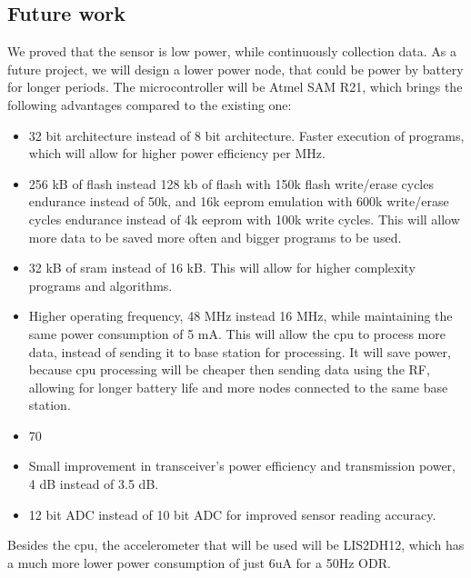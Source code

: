 \subsection{Future work}

We proved that the sensor is low power, while continuously collection data. As a future project, we will design a lower power node, that could be power by battery for longer periods. The microcontroller will be Atmel SAM R21, which brings the following advantages compared to the existing one:

\begin{itemize}
    \item 32 bit architecture instead of 8 bit architecture. Faster execution of programs, which
        will allow for higher power efficiency per MHz.
    \item 256 kB of flash instead 128 kb of flash with 150k flash write/erase cycles endurance
        instead of 50k, and 16k eeprom emulation with 600k write/erase cycles endurance instead of 4k eeprom with 100k write cycles. This will allow more data to be saved more often and bigger programs to be used.
    \item 32 kB of sram instead of 16 kB. This will allow for higher complexity programs and algorithms.
    \item Higher operating frequency, 48 MHz instead 16 MHz, while maintaining the same power
        consumption of 5 mA. This will allow the cpu to process more data, instead of sending it
        to base station for processing. It will save power, because cpu processing will be cheaper
        then sending data using the RF, allowing for longer battery life and more nodes connected
        to the same base station.
    \item 70%
    \item Small improvement in transceiver's power efficiency and transmission power, 4 dB instead of 3.5 dB.
    \item 12 bit ADC instead of 10 bit ADC for improved sensor reading accuracy.
\end{itemize}

Besides the cpu, the accelerometer that will be used will be LIS2DH12, which has a much more lower power consumption of just 6uA for a 50Hz ODR.
